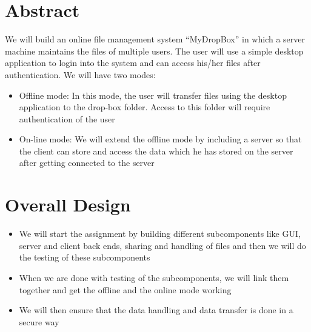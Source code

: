 \documentclass{article}
\begin{document}
	\title{}

	\author{Aniket Khandelwal(2013CS10209),
		Anupam Khandelwal(2013CS10212),\\
		Ronak Khandelwal(2013CS50295)
	}

	\date{February, 2015}
	\maketitle

	\tableofcontents
	\pagebreak

	\section{Abstract}
		We will build an online file management system ``MyDropBox''  in which a server machine maintains the files of multiple users. The user will use  a simple desktop application to login into the system and can access his/her files after authentication. We will have two modes:
		\begin{itemize}
			\item Offline mode: In this mode, the user will transfer files using the desktop application to the drop-box folder. Access to this folder will require authentication of the user
			\item On-line mode: We will extend the offline mode by including a server so that the client can store and access the data which he has stored on the server after getting connected to the server
		\end{itemize}
	\section{Overall Design}
		\begin{itemize}
			\item We will start the assignment by building different subcomponents like GUI, server and client back ends, sharing and handling of files and then we will do the testing of these subcomponents
			\item When we are done with testing of the subcomponents, we will link them together and get the offline and the online mode working
			\item We will then ensure that the data handling and data transfer is done in a secure way
		\end{itemize}
\end{document}
